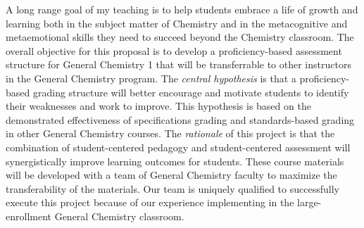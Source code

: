 \documentclass[10pt,letterpaper]{article}
\begin{document}
A long range goal of my teaching is to help students embrace a life of growth and learning both in the subject matter of Chemistry and in the metacognitive and metaemotional skills they need to succeed beyond the Chemistry classroom.
%
The overall objective for this proposal is to develop a proficiency-based assessment structure for General Chemistry 1 that will be transferrable to other instructors in the General Chemistry program. 
The \textit{central hypothesis} is that a proficiency-based grading structure will better encourage and motivate students to identify their weaknesses and work to improve. 
%
This hypothesis is based on the demonstrated effectiveness of specifications grading and standards-based grading in other General Chemistry courses.\cite{Boesdorfer2018,Martin2019}
The \textit{rationale} of this project is that the combination of student-centered pedagogy  and student-centered assessment will synergistically improve learning outcomes for students.  These course materials will be developed with a team of General Chemistry faculty to maximize the transferability of the materials. 
Our team is uniquely qualified to successfully execute this project because of our experience implementing \pogil in the large-enrollment General Chemistry classroom.
\end{document}

